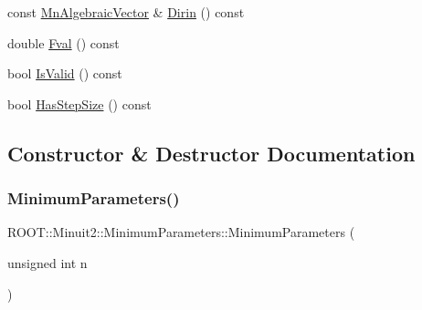 \begin{DoxyCompactItemize}
\item 
const \mbox{\hyperlink{namespaceROOT_1_1Minuit2_a62ed97730a1ca8d3fbaec64a19aa11c9}{Mn\+Algebraic\+Vector}} \& \mbox{\hyperlink{classROOT_1_1Minuit2_1_1MinimumParameters_a2c5c5f0add9ecbdf6b5d4ff962d68d15}{Dirin}} () const
\item 
double \mbox{\hyperlink{classROOT_1_1Minuit2_1_1MinimumParameters_a1f9cd63f5947771e367bedd4dafa54e3}{Fval}} () const
\item 
bool \mbox{\hyperlink{classROOT_1_1Minuit2_1_1MinimumParameters_a4b30eb313781bc8e344efa322461952a}{Is\+Valid}} () const
\item 
bool \mbox{\hyperlink{classROOT_1_1Minuit2_1_1MinimumParameters_a5533f870590176dbcf5b3e04e6470fd9}{Has\+Step\+Size}} () const
\end{DoxyCompactItemize}


\subsection{Constructor \& Destructor Documentation}
\mbox{\label{classROOT_1_1Minuit2_1_1MinimumParameters_aa6d319726e98ab129fea9d93268a21da}} 
\subsubsection{\texorpdfstring{MinimumParameters()}{MinimumParameters()}\hspace{0.1cm}{\footnotesize\ttfamily [1/12]}}
{\footnotesize\ttfamily R\+O\+O\+T\+::\+Minuit2\+::\+Minimum\+Parameters\+::\+Minimum\+Parameters (\begin{DoxyParamCaption}\item[{unsigned int}]{n }\end{DoxyParamCaption})\hspace{0.3cm}{\ttfamily [inline]}}

\mbox{\label{classROOT_1_1Minuit2_1_1MinimumParameters_a72fd528946a07bcf3e320c0505953aa8}} 
